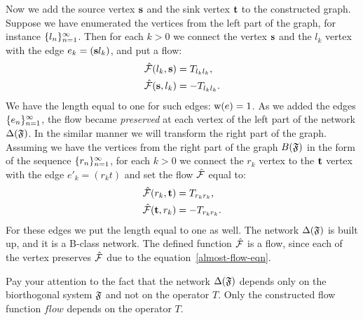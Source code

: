 \documentclass[12pt]{article}
\begin{document}
    Now we add the source vertex $\mathbf{s}$ and the sink vertex $\mathbf{t}$ to the constructed graph.
    Suppose we have enumerated the vertices from the left part of the graph, for instance $\{{l}_n\}_{n=1}^\infty$.
    Then for each $k > 0$ we connect the vertex $\mathbf{s}$ and the $l_k$ vertex with
      the edge $e_k = (\mathbf{s} l_k)$, and put a flow:
    \begin{align*}
      &\mathcal{\hat{F}}(l_k, \mathbf{s}) = T_{l_k l_k},\\
      &\mathcal{\hat{F}}(\mathbf{s}, l_k) = -T_{l_k l_k}.
    \end{align*}
    We have the length equal to one for such edges: $\mathrm{w}(e) = 1$.
    As we added the edges $\{{e}_n\}_{n=1}^\infty$, the flow became \emph{preserved} at each vertex of the left part of the network $\Delta(\mathfrak{F})$.
    In the similar manner we will transform the right part of the graph.
    Assuming we have the vertices from the right part of the graph $B(\mathfrak{F})$ in the form of the sequence $\{{r}_n\}_{n=1}^\infty$,
      for each $k > 0$ we connect the $r_k$ vertex to the $\mathbf{t}$ vertex with the edge $e'_k=(r_k t)$
      and set the flow $\mathcal{\hat{F}}$ equal to:
    \begin{align*}
      &\mathcal{\hat{F}}(r_k, \mathbf{t}) = T_{r_k r_k},\\
      &\mathcal{\hat{F}}(\mathbf{t}, r_k) = -T_{r_k r_k}.
    \end{align*}
    For these edges we put the length equal to one as well.
    The network $\Delta(\mathfrak{F})$ is built up, and it is a B-class network.
    The defined function $\mathcal{\hat{F}}$ is a flow, since each of the vertex preserves
      $\mathcal{\hat{F}}$ due to the equation~\eqref{almost-flow-eqn}.
    \begin{remark}
      Pay your attention to the fact that the network $\Delta(\mathfrak{F})$
        depends only on the biorthogonal system $\mathfrak{F}$ and not on the operator $T$.
      Only the constructed flow function $flow$ depends on the operator $T$.
    \end{remark}
\end{document}
